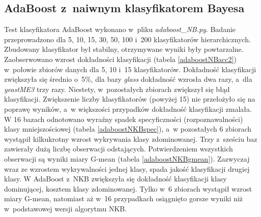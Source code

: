 \subsection{AdaBoost z~naiwnym klasyfikatorem Bayesa}
Test klasyfikatora AdaBoost wykonano w~pliku \textit{adaboost\_NB.py}. Badanie przeprowadzono dla 5, 10, 15, 30, 50, 100 i~200 klasyfikatorów hierarchicznych. Zbudowany klasyfikator był stabilny, otrzymywane wyniki były powtarzalne. Zaobserwowano wzrost dokładności klasyfikacji (tabela \ref{adaboostNBacc2}) w~połowie zbiorów danych dla 5, 10 i~15 klasyfikatorów. Dokładność klasyfikacji zwiększyła się średnio o~5\%, dla bazy \textit{glass} dokładność wzrosła dwa razy, a~dla \textit{yeastME3} trzy razy. Niestety, w~pozostałych zbiorach zwiększył się błąd klasyfikacji. Zwiększenie liczby klasyfikatorów (powyżej 15) nie przełożyło się na poprawę wyników, a~w większości przypadków dokładność klasyfikacji zmalała. W 16 bazach odnotowano wyraźny spadek specyficzności (rozpoznawalności) klasy mniejszościowej (tabela \ref{adaboostNKBspec}), a~w pozostałych 6 zbiorach wystąpił kilkukrotny wzrost wykrywania klasy zdominowanej. Trzy z~sześciu baz zawierały dużą liczbę obserwacji odstających. Potwierdzeniem wszystkich obserwacji są wyniki miary G-mean (tabela \ref{adaboostNKBgmean}). Zazwyczaj wraz ze wzrostem wykrywalności jednej klasy, spada jakość klasyfikacji drugiej klasy. W AdaBoost z~NKB zwiększyła się dokładność klasyfikacji klasy dominującej, kosztem klasy zdominowanej. Tylko w~6 zbiorach wystąpił wzrost miary G-mean, natomiast aż w~16 przypadkach osiągnięto gorsze wyniki niż w~podstawowej wersji algorytmu NKB.
